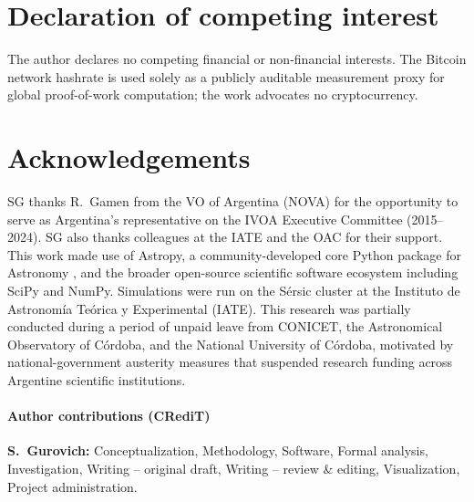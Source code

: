 \section*{Declaration of competing interest}

The author declares no competing financial or non-financial interests. The Bitcoin network
hashrate is used solely as a publicly auditable measurement proxy for global proof-of-work
computation; the work advocates no cryptocurrency.

\section*{Acknowledgements}

SG thanks R.\ Gamen from the VO of Argentina (NOVA) for the opportunity to serve as
Argentina's representative on the IVOA Executive Committee (2015--2024). SG also thanks
colleagues at the IATE and the OAC for their support. This work made use of Astropy, a
community-developed core Python package for Astronomy \citep{Astropy2013}, and the broader
open-source scientific software ecosystem including SciPy and NumPy. Simulations were run
on the S\'ersic cluster at the Instituto de Astronom\'ia Te\'orica y Experimental (IATE).
This research was partially conducted during a period of unpaid leave from CONICET, the
Astronomical Observatory of C\'ordoba, and the National University of C\'ordoba, motivated
by national-government austerity measures that suspended research funding across Argentine
scientific institutions.

\paragraph{Author contributions (CRediT)} \textbf{S.\ Gurovich:} Conceptualization,
Methodology, Software, Formal analysis, Investigation, Writing -- original draft, Writing
-- review \& editing, Visualization, Project administration.

